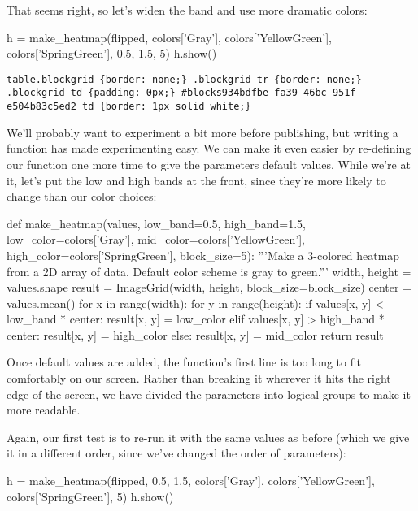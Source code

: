 \documentclass{book}
\begin{document}
That seems right, so let's widen the band and use more dramatic colors:

\begin{VerbIn}
h = make_heatmap(flipped, colors['Gray'], colors['YellowGreen'], colors['SpringGreen'], 0.5, 1.5, 5)
h.show()
\end{VerbIn}

\begin{Verbatim}
table.blockgrid {border: none;} .blockgrid tr {border: none;} .blockgrid td {padding: 0px;} #blocks934bdfbe-fa39-46bc-951f-e504b83c5ed2 td {border: 1px solid white;}
\end{Verbatim}

We'll probably want to experiment a bit more before publishing, but
writing a function has made experimenting easy. We can make it even
easier by re-defining our function one more time to give the parameters
default values. While we're at it, let's put the low and high bands at
the front, since they're more likely to change than our color choices:

\begin{VerbIn}
def make_heatmap(values,
                 low_band=0.5, high_band=1.5,
                 low_color=colors['Gray'], mid_color=colors['YellowGreen'], high_color=colors['SpringGreen'],
                 block_size=5):
    '''Make a 3-colored heatmap from a 2D array of data.
    Default color scheme is gray to green.'''
    width, height = values.shape
    result = ImageGrid(width, height, block_size=block_size)
    center = values.mean()
    for x in range(width):
        for y in range(height):
            if values[x, y] < low_band * center:
                result[x, y] = low_color
            elif values[x, y] > high_band * center:
                result[x, y] = high_color
            else:
                result[x, y] = mid_color
    return result
\end{VerbIn}

Once default values are added, the function's first line is too long to
fit comfortably on our screen. Rather than breaking it wherever it hits
the right edge of the screen, we have divided the parameters into
logical groups to make it more readable.

Again, our first test is to re-run it with the same values as before
(which we give it in a different order, since we've changed the order of
parameters):

\begin{VerbIn}
h = make_heatmap(flipped, 0.5, 1.5, colors['Gray'], colors['YellowGreen'], colors['SpringGreen'], 5)
h.show()
\end{VerbIn}
\end{document}
